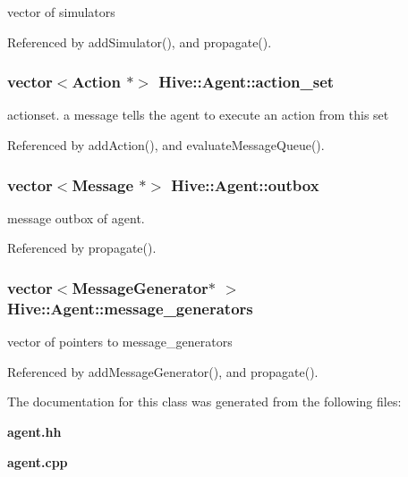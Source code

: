 vector of simulators 



Referenced by addSimulator(), and propagate().
\subsubsection[action\_\-set]{\setlength{\rightskip}{0pt plus 5cm}vector$<${\bf Action} $\ast$$>$ {\bf Hive::Agent::action\_\-set}\hspace{0.3cm}{\tt  [protected]}}\label{classHive_1_1Agent_03600d794b244ad8aeb88507f74a9370}


actionset. a message tells the agent to execute an action from this set 



Referenced by addAction(), and evaluateMessageQueue().
\subsubsection[outbox]{\setlength{\rightskip}{0pt plus 5cm}vector$<${\bf Message} $\ast$$>$ {\bf Hive::Agent::outbox}\hspace{0.3cm}{\tt  [protected]}}\label{classHive_1_1Agent_50264a5ea66534167831275f7d6e819b}


message outbox of agent. 



Referenced by propagate().
\subsubsection[message\_\-generators]{\setlength{\rightskip}{0pt plus 5cm}vector$<${\bf MessageGenerator}$\ast$ $>$ {\bf Hive::Agent::message\_\-generators}\hspace{0.3cm}{\tt  [protected]}}\label{classHive_1_1Agent_416f0406ae78863aa45d4fbfd570ad68}


vector of pointers to message\_\-generators 



Referenced by addMessageGenerator(), and propagate().

The documentation for this class was generated from the following files:\begin{CompactItemize}
\item 
{\bf agent.hh}\item 
{\bf agent.cpp}\end{CompactItemize}
